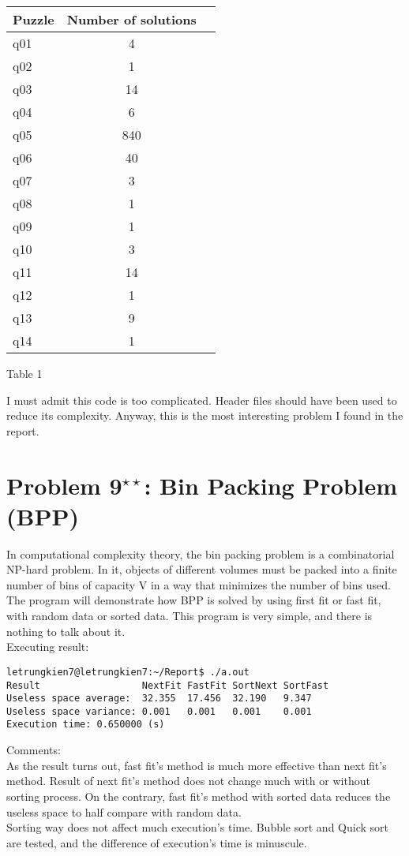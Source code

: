 \documentclass[11pt]{article}
\begin{document}
\begin{center}
\begin{tabular}{|l|c|r|} %
\hline %
Puzzle & Number of solutions\\
\hline
q01 & 4\\
q02 & 1\\
q03 & 14\\
q04 & 6\\
q05 & 840\\
q06 & 40\\
q07 & 3\\
q08 & 1\\
q09 & 1\\
q10 & 3\\
q11 & 14\\
q12 & 1\\
q13 & 9\\
q14 & 1\\
\hline
\end{tabular}
\end{center}
\begin{center}
Table 1
\end{center}
\indent I must admit this code is too complicated. Header files should have been used to reduce its complexity. Anyway, this is the most interesting problem I found in the report.
\newpage
\section{Problem 9${}^{\star\star}$: \normalsize Bin Packing Problem (BPP)}
\indent In computational complexity theory, the bin packing problem is a combinatorial NP-hard problem. In it, objects of different volumes must be packed into a finite number of bins of capacity V in a way that minimizes the number of bins used.\\
\indent The program will demonstrate how BPP is solved by using first fit or fast fit, with random data or sorted data. This program is very simple, and there is nothing to talk about it.\\
Executing result:
%
\begin{verbatim}
letrungkien7@letrungkien7:~/Report$ ./a.out 
Result                  NextFit FastFit SortNext SortFast
Useless space average:  32.355  17.456  32.190   9.347
Useless space variance: 0.001   0.001   0.001    0.001
Execution time: 0.650000 (s)
\end{verbatim}
Comments:\\
\indent As the result turns out, fast fit's method is much more effective than next fit's method. Result of next fit's method does not change much with or without sorting process. On the contrary, fast fit's method with sorted data reduces the useless space to half compare with random data. \\
\indent Sorting way does not affect much execution's time. Bubble sort and Quick sort are tested, and the difference of execution's time is minuscule.
\newpage
\end{document}
